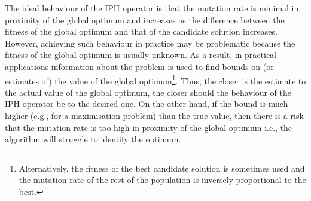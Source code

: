 \documentclass[lettersize,journal]{IEEEtran}
\newcommand{\new}[1]{\textcolor{black}{#1}}
\begin{document}
%
The ideal behaviour of the IPH operator is that the mutation rate is minimal in proximity of the global optimum and increases as the difference between the fitness of the global optimum
and that of the candidate solution increases. However, achieving such behaviour in practice may be problematic because the fitness of the global optimum is usually unknown.
As a result, in practical applications information about the problem is used to \new{find} bounds on (or estimates of)  the value of the global optimum\footnote{Alternatively, the fitness of the best candidate solution is sometimes used and 
	the mutation rate of the rest of the population is inversely proportional to the best.}.
Thus, the closer is the estimate to the actual value of the global optimum, the closer should the behaviour of the IPH operator be to the desired one.
On the other hand,  if the bound is much higher (e.g., for a maximisation problem)  than the true value, then there is a risk that the mutation rate is too high in proximity of the global optimum 
i.e., the algorithm will struggle to identify the optimum. 
\end{document}
